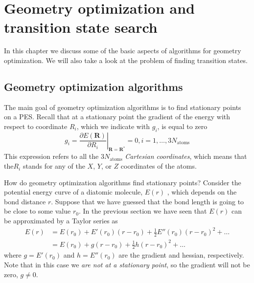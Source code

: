 \documentclass[../Main/notes.tex]{subfiles}
\begin{document}
\chapter{Geometry optimization and transition state search}

In this chapter we discuss some of the basic aspects of algorithms for geometry optimization.
We will also take a look at the problem of finding transition states.

\section{Geometry optimization algorithms}
The main goal of geometry optimization algorithms is to find stationary points on a PES.
Recall that at a stationary point the gradient of the energy with respect to coordinate $R_i$, which we indicate with $g_i$, is equal to zero
\begin{equation}
g_i = \left.\frac{\partial E(\mathbf{R})}{\partial R_i}\right|_{\mathbf{R}=\mathbf{R}^*} = 0, i=1,\ldots,3 N_\mathrm{atoms}
\end{equation}
This expression refers to all the $3 N_\mathrm{atoms}$ \emph{Cartesian coordinates}, which means that the$R_i$ stands for any of the $X$, $Y$, or $Z$ coordinates of the atoms.

How do geometry optimization algorithms find stationary points?
Consider the potential energy curve of a diatomic molecule, $E(r)$ , which depends on the bond distance $r$.
Suppose that we have guessed that the bond length is going to be close to some value $r_0$.
In the previous section we have seen that $E(r)$ can be approximated by a Taylor series as
\begin{equation}
\begin{split}
E(r) & = E(r_0) + E'(r_0) (r - r_0) + \frac{1}{2} E''(r_0) (r - r_0)^2 + \ldots \\
& = E(r_0) + g (r - r_0) + \frac{1}{2} h (r - r_0)^2 + \ldots
\end{split}
\end{equation}
where $g = E'(r_0)$ and $h = E''(r_0)$ are the gradient and hessian, respectively.
Note that in this case we \emph{are not at a stationary point}, so the gradient will not be zero, $g \neq 0$.
\end{document}

